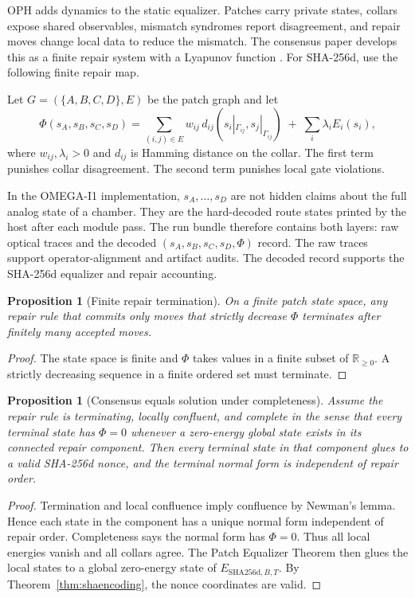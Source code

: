 \documentclass[11pt]{article}
\newtheorem{proposition}[theorem]{Proposition}
\theoremstyle{definition}
\theoremstyle{remark}
\newcommand{\shaD}{\mathrm{SHA256d}}
\begin{document}
OPH adds dynamics to the static equalizer. Patches carry private states,
collars expose shared observables, mismatch syndromes report disagreement, and
repair moves change local data to reduce the mismatch. The consensus paper
develops this as a finite repair system with a Lyapunov function
\cite{OPHConsensusCurrent}. For SHA-256d, use the following finite repair map.

Let \(G=(\{A,B,C,D\},E)\) be the patch graph and let
\[
\Phi(s_A,s_B,s_C,s_D)
=
\sum_{(i,j)\in E}
w_{ij}\,
d_{ij}\!\left(s_i|_{\Gamma_{ij}},s_j|_{\Gamma_{ij}}\right)
\;+\;
\sum_i \lambda_i E_i(s_i),
\]
where \(w_{ij},\lambda_i>0\) and \(d_{ij}\) is Hamming distance on the collar.
The first term punishes collar disagreement. The second term punishes local
gate violations.

In the OMEGA-I1 implementation, \(s_A,\ldots,s_D\) are not hidden claims about
the full analog state of a chamber. They are the hard-decoded route states
printed by the host after each module pass. The run bundle therefore contains
both layers: raw optical traces and the decoded \((s_A,s_B,s_C,s_D,\Phi)\)
record. The raw traces support operator-alignment and artifact audits. The
decoded record supports the SHA-256d equalizer and repair accounting.

\begin{proposition}[Finite repair termination]
\label{prop:repairtermination}
On a finite patch state space, any repair rule that commits only moves that
strictly decrease \(\Phi\) terminates after finitely many accepted moves.
\end{proposition}

\begin{proof}
The state space is finite and \(\Phi\) takes values in a finite subset of
\(\mathbb R_{\ge 0}\). A strictly decreasing sequence in a finite ordered set
must terminate.
\end{proof}

\begin{proposition}[Consensus equals solution under completeness]
\label{prop:repaircomplete}
Assume the repair rule is terminating, locally confluent, and complete in the
sense that every terminal state has \(\Phi=0\) whenever a zero-energy global
state exists in its connected repair component. Then every terminal state in
that component glues to a valid SHA-256d nonce, and the terminal normal form is
independent of repair order.
\end{proposition}

\begin{proof}
Termination and local confluence imply confluence by Newman's lemma. Hence each
state in the component has a unique normal form independent of repair order.
Completeness says the normal form has \(\Phi=0\). Thus all local energies vanish
and all collars agree. The Patch Equalizer Theorem then glues the local states
to a global zero-energy state of \(E_{\shaD,B,T}\). By
Theorem~\ref{thm:shaencoding}, the nonce coordinates are valid.
\end{proof}
\end{document}
